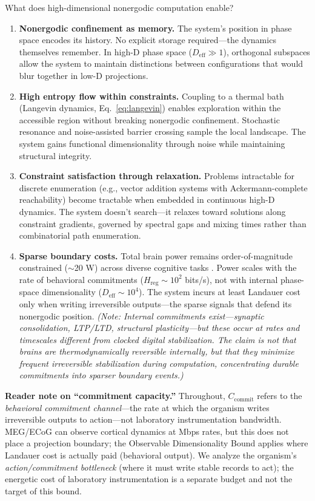 \documentclass[12pt]{article}
\begin{document}
What does high-dimensional nonergodic computation enable?

\begin{enumerate}
\item \textbf{Nonergodic confinement as memory.} The system's position in phase space encodes its history. No explicit storage required---the dynamics themselves remember. In high-D phase space ($D_{\text{eff}} \gg 1$), orthogonal subspaces allow the system to maintain distinctions between configurations that would blur together in low-D projections.

\item \textbf{High entropy flow within constraints.} Coupling to a thermal bath (Langevin dynamics, Eq.~\ref{eq:langevin}) enables exploration within the accessible region without breaking nonergodic confinement. Stochastic resonance and noise-assisted barrier crossing sample the local landscape. The system gains functional dimensionality through noise while maintaining structural integrity.

\item \textbf{Constraint satisfaction through relaxation.} Problems intractable for discrete enumeration (e.g., vector addition systems with Ackermann-complete reachability) become tractable when embedded in continuous high-D dynamics. The system doesn't search---it relaxes toward solutions along constraint gradients, governed by spectral gaps and mixing times rather than combinatorial path enumeration.

\item \textbf{Sparse boundary costs.} Total brain power remains order-of-magnitude constrained ($\sim$20 W) across diverse cognitive tasks \cite{attwell2001}. Power scales with the rate of behavioral commitments ($H_{\text{reg}} \sim 10^2$ bits/s), not with internal phase-space dimensionality ($D_{\text{eff}} \sim 10^4$). The system incurs at least Landauer cost only when writing irreversible outputs---the sparse signals that defend its nonergodic position. \textit{(Note: Internal commitments exist---synaptic consolidation, LTP/LTD, structural plasticity---but these occur at rates and timescales different from clocked digital stabilization. The claim is not that brains are thermodynamically reversible internally, but that they minimize frequent irreversible stabilization during computation, concentrating durable commitments into sparser boundary events.)}
\end{enumerate}

\textbf{Reader note on ``commitment capacity.''} Throughout, $C_{\text{commit}}$ refers to the \emph{behavioral commitment channel}---the rate at which the organism writes irreversible outputs to action---not laboratory instrumentation bandwidth. MEG/ECoG can observe cortical dynamics at Mbps rates, but this does not place a projection boundary; the Observable Dimensionality Bound applies where Landauer cost is actually paid (behavioral output). We analyze the organism's \textit{action/commitment bottleneck} (where it must write stable records to act); the energetic cost of laboratory instrumentation is a separate budget and not the target of this bound.
\end{document}
